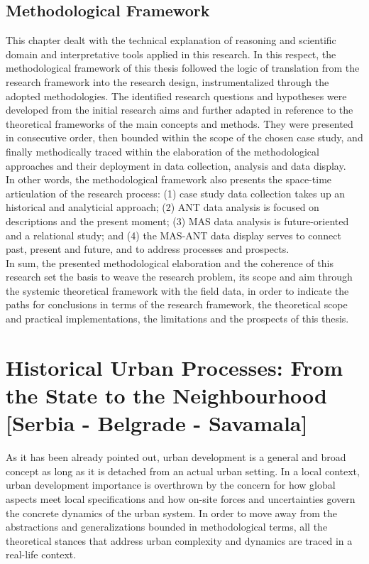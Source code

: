 \documentclass[11pt]{report}
\begin{document}
\section{Methodological Framework}

This chapter dealt with the technical explanation of reasoning and scientific domain and interpretative tools applied in this research. In this respect, the methodological framework of this thesis followed the logic of translation from the research framework into the research design, instrumentalized through the adopted methodologies. The identified research questions and hypotheses were developed from the initial research aims and further adapted in reference to the theoretical frameworks of the main concepts and methods. They were presented in consecutive order, then bounded within the scope of the chosen case study, and finally methodically traced within the elaboration of the methodological approaches and their deployment in data collection, analysis and data display.
\\

In other words, the methodological framework also presents the space-time articulation of the research process: (1) case study data collection takes up an historical and analyticial approach; (2) ANT data analysis is focused on descriptions and the present moment; (3) MAS data analysis is future-oriented and a relational study; and (4) the MAS-ANT data display serves to connect past, present and future, and to address processes and prospects.
\\

In sum, the presented methodological elaboration and the coherence of this research set the basis to weave the research problem, its scope and aim through the systemic theoretical framework with the field data, in order to indicate the paths for conclusions in terms of the research framework, the theoretical scope and practical implementations, the limitations and the prospects of this thesis.



\chapter{Historical Urban Processes: From the State to the Neighbourhood [Serbia - Belgrade - Savamala]}

As it has been already pointed out, urban development is a general and broad concept as long as it is detached from an actual urban setting. In a local context, urban development importance is overthrown by the concern for how global aspects meet local specifications and how on-site forces and uncertainties govern the concrete dynamics of the urban system. In order to move away from the abstractions and generalizations bounded in methodological terms, all the theoretical stances that address urban complexity and dynamics are traced in a real-life context.
\\
\end{document}
